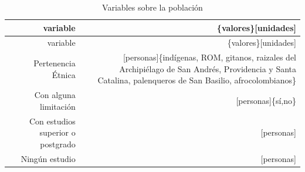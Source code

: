\documentclass[12pt,]{book}
\begin{document}
\begin{longtable}[]{@{}rr@{}}
\caption{\label{tab:vars-poblacion} Variables sobre la
población}\tabularnewline
\toprule
\begin{minipage}[b]{0.09\columnwidth}\raggedleft\strut
variable\strut
\end{minipage} & \begin{minipage}[b]{0.38\columnwidth}\raggedleft\strut
\{valores\}{[}unidades{]}\strut
\end{minipage}\tabularnewline
\midrule
\endfirsthead
\toprule
\begin{minipage}[b]{0.09\columnwidth}\raggedleft\strut
variable\strut
\end{minipage} & \begin{minipage}[b]{0.38\columnwidth}\raggedleft\strut
\{valores\}{[}unidades{]}\strut
\end{minipage}\tabularnewline
\midrule
\endhead
\begin{minipage}[t]{0.09\columnwidth}\raggedleft\strut
Pertenencia Étnica\strut
\end{minipage} & \begin{minipage}[t]{0.38\columnwidth}\raggedleft\strut
{[}personas{]}\{indígenas, ROM, gitanos, raizales del Archipiélago de
San Andrés, Providencia y Santa Catalina, palenqueros de San Basilio,
afrocolombianos\}\strut
\end{minipage}\tabularnewline
\begin{minipage}[t]{0.09\columnwidth}\raggedleft\strut
Con alguna limitación\strut
\end{minipage} & \begin{minipage}[t]{0.38\columnwidth}\raggedleft\strut
{[}personas{]}\{sí,no\}\strut
\end{minipage}\tabularnewline
\begin{minipage}[t]{0.09\columnwidth}\raggedleft\strut
Con estudios superior o postgrado\strut
\end{minipage} & \begin{minipage}[t]{0.38\columnwidth}\raggedleft\strut
{[}personas{]}\strut
\end{minipage}\tabularnewline
\begin{minipage}[t]{0.09\columnwidth}\raggedleft\strut
Ningún estudio\strut
\end{minipage} & \begin{minipage}[t]{0.38\columnwidth}\raggedleft\strut
{[}personas{]}\strut
\end{minipage}\tabularnewline
\bottomrule
\end{longtable}
\end{document}
